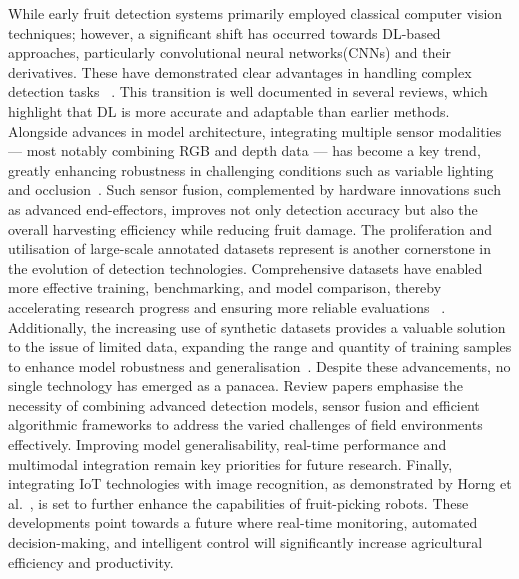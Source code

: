 \documentclass[a4paper,fleqn]{cas-dc}
\begin{document}
While early fruit detection systems primarily employed classical computer vision techniques; however, a significant shift has occurred towards DL-based approaches, particularly convolutional neural networks(CNNs) and their derivatives. These have demonstrated clear advantages in handling complex detection tasks ~\cite{Ting:2024_ieee,Goay:2021_access,sa2016deepfruits}. This transition is well documented in several reviews, which highlight that DL is more accurate and adaptable than earlier methods.
Alongside advances in model architecture, integrating multiple sensor modalities — most notably combining RGB and depth data — has become a key trend, greatly enhancing robustness in challenging conditions such as variable lighting and occlusion~\cite{jun2021towards}. Such sensor fusion, complemented by hardware innovations such as advanced end-effectors, improves not only detection accuracy but also the overall harvesting efficiency  while reducing  fruit damage.
The proliferation and utilisation of large-scale annotated datasets represent is another cornerstone in the evolution of detection technologies. Comprehensive datasets have enabled more effective training, benchmarking, and model comparison, thereby accelerating research progress and ensuring more reliable evaluations ~\cite{yu2020real,yu2019fruit,wan2020faster}. Additionally, the increasing use of synthetic datasets provides a valuable solution to the issue of limited data, expanding the range and quantity of training samples to enhance model robustness and generalisation~\cite{barth2018data}.
Despite these advancements, no single technology has emerged as a panacea. Review papers emphasise the necessity of combining advanced detection models, sensor fusion and efficient algorithmic frameworks to address the varied challenges of field environments effectively. Improving model generalisability, real-time performance and multimodal integration remain key priorities for future research.
Finally, integrating IoT technologies with image recognition, as demonstrated by Horng et al.~\cite{horng2019smart}, is set to further enhance the capabilities of fruit-picking robots. These developments point towards a future where real-time monitoring, automated decision-making, and intelligent control will significantly increase agricultural efficiency and productivity.
\end{document}
